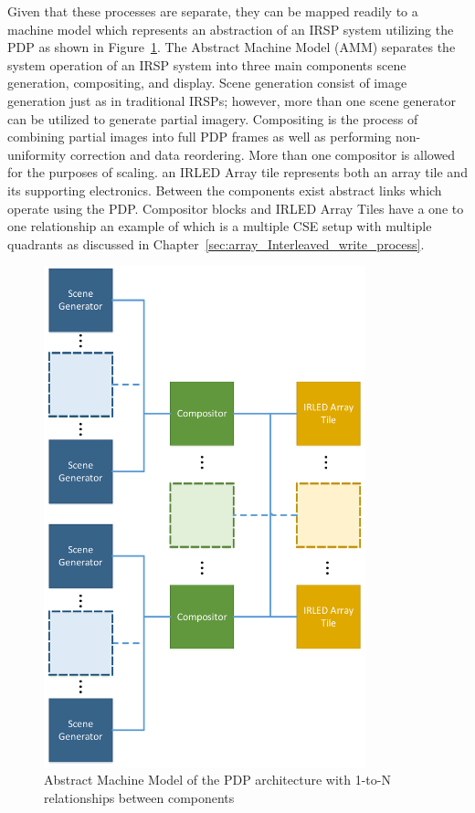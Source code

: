     Given that these processes are separate, they can be mapped readily to a machine model which represents an abstraction of an IRSP system utilizing the PDP as shown in Figure~\ref{fig:amm}. The Abstract Machine Model (AMM) separates the system operation of an IRSP system into three main components scene generation, compositing, and display. Scene generation consist of image generation just as in traditional IRSPs; however, more than one scene generator can be utilized to generate partial imagery. Compositing is the process of combining partial images into full PDP frames as well as performing non-uniformity correction and data reordering. More than one compositor is allowed for the purposes of scaling. an IRLED Array tile represents both an array tile and its supporting electronics. Between the components exist abstract links which operate using the PDP. Compositor blocks and IRLED Array Tiles have a one to one relationship an example of which is a multiple CSE setup with multiple quadrants as discussed in Chapter~\ref{sec:array_Interleaved_write_process}.

    \begin{figure}
        \centering
        \includegraphics[width=0.83\textwidth]{fig/amm.pdf}
        \caption{Abstract Machine Model of the PDP architecture with 1-to-N relationships between components}
        \label{fig:amm}
    \end{figure}

